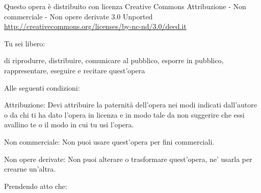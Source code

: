 
{\smaller\setlength{\parindent}{0pt}%
\raggedright\label{copyright-details}
{\centering

{\large\ccbyncnd}
\bigskip

Questo opera è distribuito con licenza Creative Commons Attribuzione - Non commerciale - Non opere derivate 3.0 Unported\\
\href{http://creativecommons.org/licenses/by-nc-nd/3.0/deed.it}{http://creativecommons.org/licenses/by-nc-nd/3.0/deed.it}

}
\bigskip

Tu sei libero:
\vspace*{-\baselineskip}

\begin{packeditemize}
\item di riprodurre, distribuire, comunicare al pubblico, esporre in pubblico, rappresentare, eseguire e recitare quest'opera
\end{packeditemize}

Alle seguenti condizioni:
\vspace*{-\baselineskip}

\begin{packeditemize}
\item Attribuzione: Devi attribuire la paternità dell'opera nei modi indicati dall'autore o da chi ti ha dato l'opera in licenza e in modo tale da non suggerire che essi avallino te o il modo in cui tu usi l'opera.
\item Non commerciale: Non puoi usare quest'opera per fini commerciali.
\item Non opere derivate: Non puoi alterare o trasformare quest'opera, ne' usarla per crearne un'altra.
\end{packeditemize}

Prendendo atto che:
\vspace*{-\baselineskip}

}

